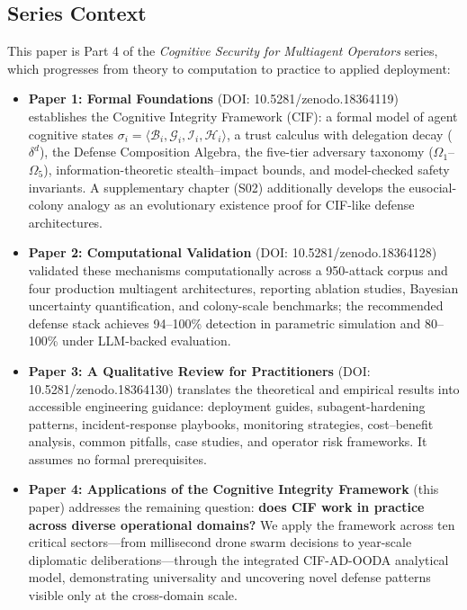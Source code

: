 \documentclass[
]{article}
\providecommand{\tightlist}{%
  \setlength{\itemsep}{0pt}\setlength{\parskip}{0pt}}
\begin{document}
\subsection{Series Context}\label{series-context}

This paper is Part 4 of the \emph{Cognitive Security for Multiagent
Operators} series, which progresses from theory to computation to
practice to applied deployment:

\begin{itemize}
\tightlist
\item
  \textbf{Paper 1: Formal Foundations} \cite{friedman2026cogsec1} (DOI:
  10.5281/zenodo.18364119) establishes the Cognitive Integrity Framework
  (CIF): a formal model of agent cognitive states
  \(\sigma_i = \langle \mathcal{B}_i, \mathcal{G}_i, \mathcal{I}_i, \mathcal{H}_i \rangle\),
  a trust calculus with delegation decay (\(\delta^d\)), the Defense
  Composition Algebra, the five-tier adversary taxonomy
  (\(\Omega_1\)--\(\Omega_5\)), information-theoretic stealth--impact
  bounds, and model-checked safety invariants. A supplementary chapter
  (S02) additionally develops the eusocial-colony analogy as an
  evolutionary existence proof for CIF-like defense architectures.
\item
  \textbf{Paper 2: Computational Validation} \cite{friedman2026cogsec2}
  (DOI: 10.5281/zenodo.18364128) validated these mechanisms
  computationally across a 950-attack corpus and four production
  multiagent architectures, reporting ablation studies, Bayesian
  uncertainty quantification, and colony-scale benchmarks; the
  recommended defense stack achieves 94--100\% detection in parametric
  simulation and 80--100\% under LLM-backed evaluation.
\item
  \textbf{Paper 3: A Qualitative Review for Practitioners}
  \cite{friedman2026cogsec3} (DOI: 10.5281/zenodo.18364130) translates
  the theoretical and empirical results into accessible engineering
  guidance: deployment guides, subagent-hardening patterns,
  incident-response playbooks, monitoring strategies, cost--benefit
  analysis, common pitfalls, case studies, and operator risk frameworks.
  It assumes no formal prerequisites.
\item
  \textbf{Paper 4: Applications of the Cognitive Integrity Framework}
  (this paper) addresses the remaining question: \textbf{does CIF work
  in practice across diverse operational domains?} We apply the
  framework across ten critical sectors---from millisecond drone swarm
  decisions to year-scale diplomatic deliberations---through the
  integrated CIF-AD-OODA analytical model, demonstrating universality
  and uncovering novel defense patterns visible only at the cross-domain
  scale.
\end{itemize}
\end{document}
